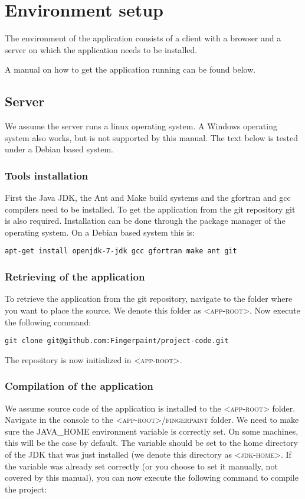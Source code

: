 \chapter{Environment setup}
\label{environment_setup}
The environment of the \applicationname{} application consists of a client with a browser and a server on which the application needs to be installed.

A manual on how to get the \applicationname{} application running can be found below.

\section{Server}
We assume the server runs a linux operating system. A Windows operating system also works, but is not supported by this manual. The text below is tested under a Debian based system.

\subsection{Tools installation}
First the Java JDK, the Ant and Make build systems and the gfortran and gcc compilers need to be installed. To get the application from the git repository git is also required. Installation can be done through the package manager of the operating system. On a Debian based system this is:

\begin{verbatim}
apt-get install openjdk-7-jdk gcc gfortran make ant git
\end{verbatim}

\subsection{Retrieving of the application}
To retrieve the application from the git repository, navigate to the folder where you want to place the source.
We denote this folder as \textsc{<app-root>}. Now execute the following command:

\begin{verbatim}
git clone git@github.com:Fingerpaint/project-code.git
\end{verbatim}

The repository is now initialized in \textsc{<app-root>}.

\subsection{Compilation of the application}
We assume source code of the application is installed to the \textsc{<app-root>} folder.
Navigate in the console to the \textsc{<app-root>/fingerpaint} folder. 
We need to make sure the \textsc{JAVA\_HOME} environment variable is correctly set. On some machines, this will be the case by default. The variable should be set to the home directory of the JDK that was just installed (we denote this directory as \textsc{<jdk-home>}. If the variable was already set correctly (or you choose to set it manually, not covered by this manual), you can now execute the following command to compile the project:

